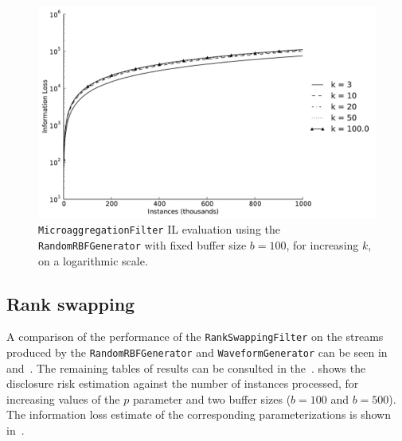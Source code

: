 \begin{figure}[h]
	\centering
	\includegraphics[width=0.9\linewidth]{figures/il-log_ma-random.pdf}
	\caption[Microaggregation IL evaluation ($b = 100$), logarithmic scale.]{\texttt{MicroaggregationFilter} IL evaluation using the \texttt{RandomRBFGenerator} with fixed buffer size $b = 100$, for increasing $k$, on a logarithmic scale.}
	\label{fig:results-il-log-ma}
\end{figure}

\clearpage

\subsection{Rank swapping}
\label{Benchmarking:Results:RankSwap}

A comparison of the performance of the \texttt{RankSwappingFilter} on the streams produced by the \texttt{RandomRBFGenerator} and \texttt{WaveformGenerator} can be seen in~ and~. The remaining tables of results can be consulted in the~.  shows the disclosure risk estimation against the number of instances processed, for increasing values of the $p$ parameter and two buffer sizes ($b = 100$ and $b=500$). The information loss estimate of the corresponding parameterizations is shown in~.

